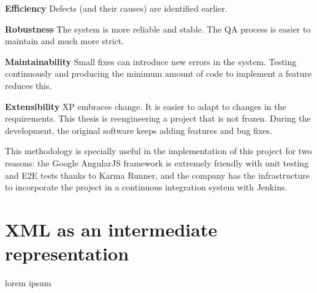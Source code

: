 \textbf{Efficiency} Defects (and their causes) are identified earlier.

\textbf{Robustness} The system is more reliable and stable. 
The \ac{QA} process is easier to maintain and much more strict.

\textbf{Maintainability} Small fixes can introduce new errors in the system. 
Testing continuously and producing the minimum amount of code to implement a feature reduces this.

\textbf{Extensibility} \ac{XP} embraces change. 
It is easier to adapt to changes in the requirements. 
This thesis is reengineering a project that is not frozen. 
During the development, the original software keeps adding features and bug fixes.

This methodology is specially useful in the implementation of this project for two reasons: 
the Google AngularJS framework is extremely friendly with unit testing and \ac{E2E} tests thanks to Karma Runner, and the company has the infrastructure to incorporate the project in a continuous integration system with Jenkins.

\section{XML as an intermediate representation}

lorem ipsum
